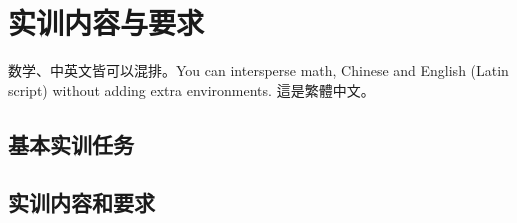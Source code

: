 \section{实训内容与要求}
\songti
数学、中英文皆可以混排。You can intersperse math, Chinese and English (Latin script) without adding extra environments.
這是繁體中文。

\subsection{基本实训任务}


\subsection{实训内容和要求}